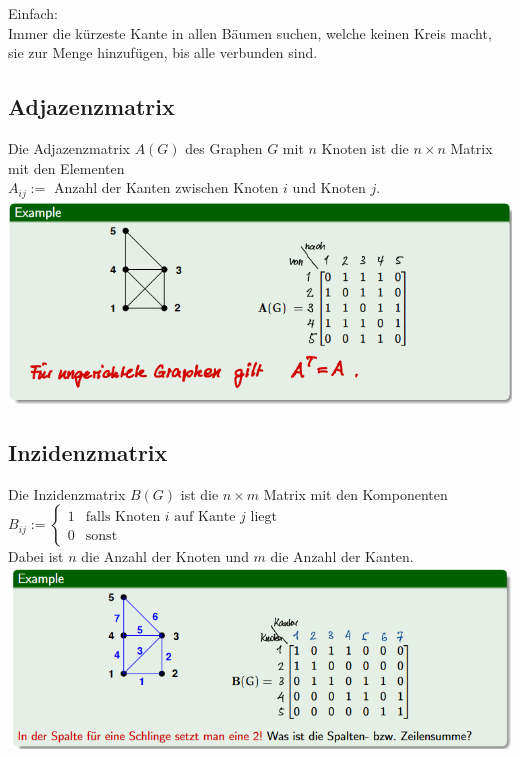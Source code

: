 \documentclass[12pt]{scrartcl}
\begin{document}
Einfach:\\
Immer die kürzeste Kante in allen Bäumen suchen, welche keinen Kreis macht, sie zur Menge 
hinzufügen, bis alle verbunden sind.


\newpage
\subsection{Adjazenzmatrix}
Die Adjazenzmatrix $A(G)$ des Graphen $G$ mit $n$ Knoten ist die $n \times n$ Matrix
mit den Elementen\\
$A_{ij} :=$ Anzahl der Kanten zwischen Knoten $i$ und Knoten $j$.\\

\includegraphics[width=14cm]{img/adjazenzmatrix.png}



\subsection{Inzidenzmatrix}
Die Inzidenzmatrix $B(G)$ ist die $n \times m$ Matrix mit den Komponenten\\
$B_{ij} := \begin{cases}
    1 & \text{falls Knoten $i$ auf Kante $j$ liegt}\\
    0 & \text{sonst}
\end{cases}$\\

Dabei ist $n$ die Anzahl der Knoten und $m$ die Anzahl der Kanten.\\

\includegraphics[width=14cm]{img/inzidenzmatrix.png}
\end{document}
